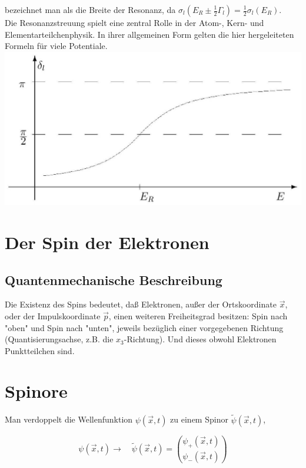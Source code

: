 \documentclass[10pt, letterpaper]{article}
\begin{document}
bezeichnet man als die Breite der Resonanz, da $\sigma_{l}\left(E_{R} \pm \frac{1}{2} \Gamma_{l}\right)=\frac{1}{2} \sigma_{l}\left(E_{R}\right)$.\\
Die Resonanzstreuung spielt eine zentral Rolle in der Atom-, Kern- und Elementarteilchenphysik. In ihrer allgemeinen Form gelten die hier hergeleiteten Formeln für viele Potentiale.\\
\includegraphics[scale=0.2, center]{2025_05_21_d5590f158a899e385c7cg-22}








\pagebreak

\pagebreak

\section{Der Spin der Elektronen}


\subsection*{Quantenmechanische Beschreibung}
Die Existenz des Spins bedeutet, daß Elektronen, außer der Ortskoordinate $\vec{x}$, oder der Impulskoordinate $\vec{p}$, einen weiteren Freiheitsgrad besitzen: Spin nach "oben" und Spin nach "unten", jeweils bezüglich einer vorgegebenen Richtung (Quantisierungsachse, z.B. die $x_{3}$-Richtung). Und dieses obwohl Elektronen Punktteilchen sind.

\section*{Spinore}
Man verdoppelt die Wellenfunktion $\psi(\vec{x}, t)$ zu einem Spinor $\tilde{\psi}(\vec{x}, t)$,

$$
\psi(\vec{x}, t) \rightarrow \quad \tilde{\psi}(\vec{x}, t)=\binom{\psi_{+}(\vec{x}, t)}{\psi_{-}(\vec{x}, t)}
$$
\end{document}
